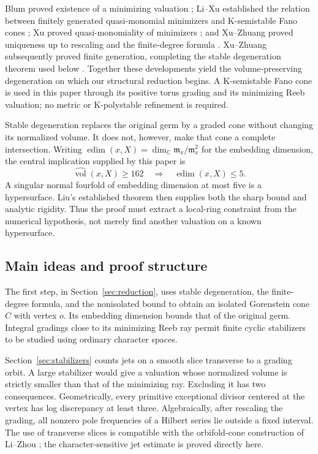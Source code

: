 \documentclass[11pt]{article}
\theoremstyle{definition}
\theoremstyle{remark}
\numberwithin{equation}{section}
\newcommand{\C}{\mathbb C}
\newcommand{\m}{\mathfrak m}
\newcommand{\nvol}{\widehat{\operatorname{vol}}}
\newcommand{\edim}{\operatorname{edim}}
\begin{document}
Blum proved existence of a minimizing valuation \cite{Blum}; Li--Xu established the relation between finitely generated quasi-monomial minimizers and K-semistable Fano cones \cite{LiXu}; Xu proved quasi-monomiality of minimizers \cite{XuQM}; and Xu--Zhuang proved uniqueness up to rescaling and the finite-degree formula \cite{XZfinite}. Xu--Zhuang subsequently proved finite generation, completing the stable degeneration theorem used below \cite{XZstable}. Together these developments yield the volume-preserving degeneration on which our structural reduction begins. A K-semistable Fano cone is used in this paper through its positive torus grading and its minimizing Reeb valuation; no metric or K-polystable refinement is required.

Stable degeneration replaces the original germ by a graded cone without changing its normalized volume. It does not, however, make that cone a complete intersection. Writing \(\edim(x,X)=\dim_\C\m_x/\m_x^2\) for the embedding dimension, the central implication supplied by this paper is
\begin{equation}\label{eq:strategy}
\nvol(x,X)\ge162
\quad\Longrightarrow\quad
\edim(x,X)\le5.
\end{equation}
A singular normal fourfold of embedding dimension at most five is a hypersurface. Liu's established theorem then supplies both the sharp bound and analytic rigidity. Thus the proof must extract a local-ring constraint from the numerical hypothesis, not merely find another valuation on a known hypersurface.

\subsection{Main ideas and proof structure}

The first step, in Section~\ref{sec:reduction}, uses stable degeneration, the finite-degree formula, and the nonisolated bound to obtain an isolated Gorenstein cone \(C\) with vertex \(o\). Its embedding dimension bounds that of the original germ. Integral gradings close to its minimizing Reeb ray permit finite cyclic stabilizers to be studied using ordinary character spaces.

Section~\ref{sec:stabilizers} counts jets on a smooth slice transverse to a grading orbit. A large stabilizer would give a valuation whose normalized volume is strictly smaller than that of the minimizing ray. Excluding it has two consequences. Geometrically, every primitive exceptional divisor centered at the vertex has log discrepancy at least three. Algebraically, after rescaling the grading, all nonzero pole frequencies of a Hilbert series lie outside a fixed interval. The use of transverse slices is compatible with the orbifold-cone construction of Li--Zhou \cite{LiZhou}; the character-sensitive jet estimate is proved directly here.
\end{document}
